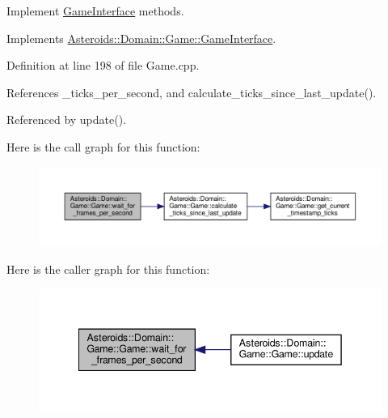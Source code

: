 Implement \hyperlink{classAsteroids_1_1Domain_1_1Game_1_1GameInterface}{Game\+Interface} methods. 



Implements \hyperlink{classAsteroids_1_1Domain_1_1Game_1_1GameInterface_a91c58ac4b19f3e2325b91fff0e3c187a}{Asteroids\+::\+Domain\+::\+Game\+::\+Game\+Interface}.



Definition at line 198 of file Game.\+cpp.



References \+\_\+ticks\+\_\+per\+\_\+second, and calculate\+\_\+ticks\+\_\+since\+\_\+last\+\_\+update().



Referenced by update().

Here is the call graph for this function\+:\nopagebreak
\begin{figure}[H]
\begin{center}
\leavevmode
\includegraphics[width=350pt]{classAsteroids_1_1Domain_1_1Game_1_1Game_ab586cddf7972dbb9313ad3b241b550b4_cgraph}
\end{center}
\end{figure}
Here is the caller graph for this function\+:\nopagebreak
\begin{figure}[H]
\begin{center}
\leavevmode
\includegraphics[width=342pt]{classAsteroids_1_1Domain_1_1Game_1_1Game_ab586cddf7972dbb9313ad3b241b550b4_icgraph}
\end{center}
\end{figure}
\mbox{\label{classAsteroids_1_1Domain_1_1Game_1_1Game_ac3e1c5498adb64ea278d1a4b69db412b}} 
